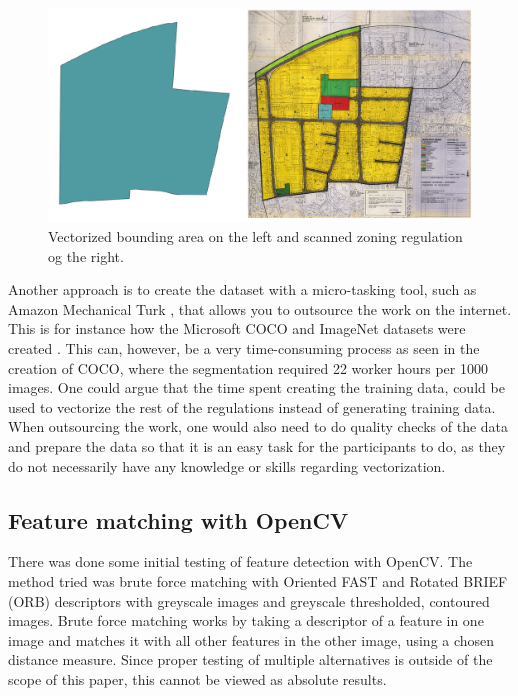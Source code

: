 \begin{figure}[H]
    \centering
    \includegraphics[width=\linewidth]{fig/georef-problem.png}
    \caption{Vectorized bounding area on the left and scanned zoning regulation og the right.}
    \label{fig:georeferencing}
\end{figure}

Another approach is to create the dataset with a micro-tasking tool, such as Amazon Mechanical Turk \cite{AmazonMechanicalTurk2017}, that allows you to outsource the work on the internet. This is for instance how the Microsoft COCO and ImageNet datasets were created \cite{Lin2014}. This can, however, be a very time-consuming process as seen in the creation of COCO, where the segmentation required 22 worker hours per 1000 images. One could argue that the time spent creating the training data, could be used to vectorize the rest of the regulations instead of generating training data. When outsourcing the work, one would also need to do quality checks of the data and prepare the data so that it is an easy task for the participants to do, as they do not necessarily have any knowledge or skills regarding vectorization.

\subsection{Feature matching with OpenCV}
There was done some initial testing of feature detection with OpenCV. The method tried was brute force matching with Oriented FAST and Rotated BRIEF (ORB) descriptors with greyscale images and greyscale thresholded, contoured images. Brute force matching works by taking a descriptor of a feature in one image and matches it with all other features in the other image, using a chosen distance measure. Since proper testing of multiple alternatives is outside of the scope of this paper, this cannot be viewed as absolute results.

